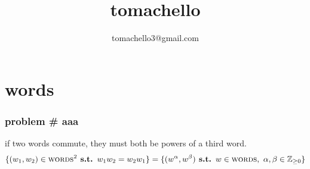 \documentclass{article}
\title{tomachello}
\author{tomachello3@gmail.com}
\date{}
\newcommand{\st}{\textbf{ s.t. }}
\newcommand{\SP}{\text{ }}
\newcommand{\problem}[1]{\subsubsection*{problem \# #1}}
\newcommand{\chapter}[1]{\section*{#1}}
\newcommand{\Zpf}{\mathbb{Z}_{\ge0}}
\newcommand{\set}[1]{\textsc{#1}}
\begin{document}
\maketitle

\chapter{words}
\problem{aaa} if two words commute, they must both be powers of a third word. 
$$\{(w_1,w_2)\in \set{words}^2 \st w_1w_2=w_2w_1\}=\{(w^\alpha,w^\beta)\st w\in\set{words},\SP\alpha,\beta\in\Zpf\}$$
\end{document}
